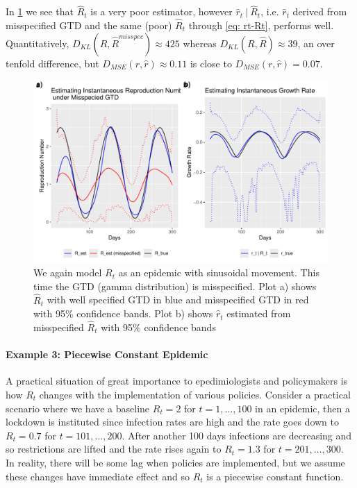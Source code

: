 \documentclass[12pt]{article}
\begin{document}
    In \cref{fig: misspec} we see that $\hat{R}_t$ is a very poor estimator,
    however $\hat{r}_t \ |\ \hat{R}_t$, i.e. $\hat{r}_t$ derived from misspecified GTD and the same (poor) $\hat{R}_t$ through \cref{eq: rt-Rt}, performs well. 
    Quantitatively, $D_{KL}(R, \hat{R}^{misspec}) \approx 425$ whereas $D_{KL}(R, \hat{R}) \approx 39$, an over tenfold difference, but $D_{MSE}(r, \hat{r}) \approx 0.11$ is close to $D_{MSE}(r, \hat{r}) = 0.07$. 

    \begin{figure}[h]
      \centering
      \includegraphics[scale = 0.6]{epi_misspec.pdf}
      \caption{We again model $R_t$ as an epidemic with sinusoidal movement. This time the GTD (gamma distribution) is misspecified. Plot a) shows $\hat{R}_t$ with well specified GTD in blue and misspecified GTD in red with 95\% confidence bands. Plot b) shows $\hat{r}_t$ estimated from misspecified $\hat{R}_t$ with 95\% confidence bands}
      \label{fig: misspec}
    \end{figure}

    \paragraph{Example 3: Piecewise Constant Epidemic} A practical situation of great importance to epedimiologists and policymakers is how $R_t$ changes with the implementation of various policies. 
    Consider a practical scenario where we have a baseline $R_t = 2$ for $t = 1,\dots,100$ in an epidemic, then a lockdown is instituted since infection rates are high and the rate goes down to 
    $R_t = 0.7$ for $t = 101,\dots,200$. After another 100 days infections are decreasing and so restrictions are lifted and the rate rises again to $R_t = 1.3$ 
    for $t = 201,\dots,300$. In reality, there will be some lag when policies are implemented, but we assume these changes have immediate effect and so 
    $R_t$ is a piecewise constant function. 
    
\end{document}
